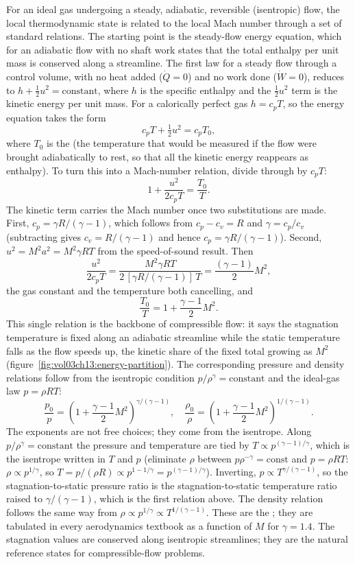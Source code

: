 For an ideal gas undergoing a steady, adiabatic, reversible
(isentropic) flow, the local thermodynamic state is related to the
local Mach number through a set of standard relations. The starting
point is the steady-flow energy equation, which for an adiabatic
flow with no shaft work states that the total enthalpy per unit mass
is conserved along a streamline. The first law for a steady flow
through a control volume, with no heat added ($\dot Q = 0$) and no
work done ($\dot W = 0$), reduces to $h + \tfrac{1}{2}u^2 =
\text{constant}$, where $h$ is the specific enthalpy and the
$\tfrac{1}{2}u^2$ term is the kinetic energy per unit mass. For a
calorically perfect gas $h = c_p T$, so the energy equation takes
the form
\[
c_p T + \tfrac{1}{2}u^2 = c_p T_0,
\]
where $T_0$ is the  (the
temperature that would be measured if the flow were brought
adiabatically to rest, so that all the kinetic energy reappears as
enthalpy). To turn this into a Mach-number relation, divide through
by $c_p T$:
\[
1 + \frac{u^2}{2 c_p T} = \frac{T_0}{T}.
\]
The kinetic term carries the Mach number once two substitutions are
made. First, $c_p = \gamma R/(\gamma - 1)$, which follows from
$c_p - c_v = R$ and $\gamma = c_p/c_v$ (subtracting gives $c_v
= R/(\gamma - 1)$ and hence $c_p = \gamma R/(\gamma - 1)$). Second,
$u^2 = M^2 a^2 = M^2 \gamma R T$ from the speed-of-sound result.
Then
\[
\frac{u^2}{2 c_p T} = \frac{M^2 \gamma R T}{2\,[\gamma R/(\gamma -
1)]\,T} = \frac{(\gamma - 1)}{2}M^2,
\]
the gas constant and the temperature both cancelling, and
\[
\frac{T_0}{T} = 1 + \frac{\gamma - 1}{2} M^2.
\]
This single relation is the backbone of compressible flow: it says
the stagnation temperature is fixed along an adiabatic streamline
while the static temperature falls as the flow speeds up, the
kinetic share of the fixed total growing as $M^2$
(figure~\ref{fig:vol03ch13:energy-partition}). The corresponding
pressure and density relations follow from the isentropic condition
$p/\rho^\gamma = \text{constant}$ and the ideal-gas law $p = \rho R
T$:
\[
\frac{p_0}{p} = \left(1 + \frac{\gamma - 1}{2} M^2\right)^{\gamma/
(\gamma - 1)},
\quad
\frac{\rho_0}{\rho} = \left(1 + \frac{\gamma - 1}{2} M^2\right)^{1/
(\gamma - 1)}.
\]
The exponents are not free choices; they come from the isentrope.
Along $p/\rho^\gamma = \text{constant}$ the pressure and temperature
are tied by $T \propto p^{(\gamma - 1)/\gamma}$, which is the
isentrope written in $T$ and $p$ (eliminate $\rho$ between
$p\rho^{-\gamma} = \text{const}$ and $p = \rho R T$: $\rho \propto
p^{1/\gamma}$, so $T = p/(\rho R) \propto p^{1 - 1/\gamma} =
p^{(\gamma - 1)/\gamma}$). Inverting, $p \propto T^{\gamma/(\gamma -
1)}$, so the stagnation-to-static pressure ratio is the
stagnation-to-static temperature ratio raised to $\gamma/(\gamma -
1)$, which is the first relation above. The density relation follows
the same way from $\rho \propto p^{1/\gamma} \propto T^{1/(\gamma -
1)}$. These are the ; they are
tabulated in every aerodynamics textbook as a function of $M$ for
$\gamma = 1.4$. The stagnation values are conserved along
isentropic streamlines; they are the natural reference states for
compressible-flow problems.

